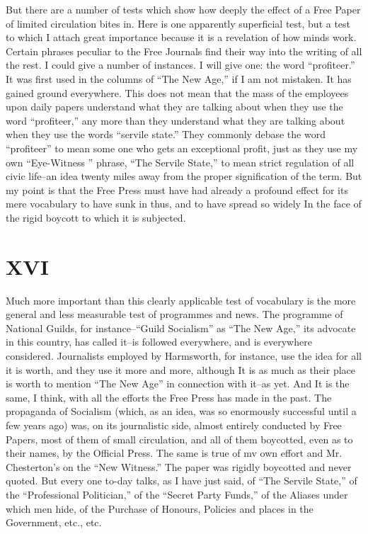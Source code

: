 \documentclass{book}
\begin{document}
But there are a number of tests which show how deeply the effect of a Free Paper of limited circulation bites in. Here is one apparently superficial test, but a test to which I attach great importance because it is a revelation of how minds work. Certain phrases peculiar to the Free Journals find their way into the writing of all the rest. I could give a number of instances. I will give one: the word “profiteer.” It was first used in the columns of “The New Age,” if I am not mistaken. It has gained ground everywhere. This does not mean that the mass of the employees upon daily papers understand what they are talking about when they use the word “profiteer,” any more than they understand what they are talking about when they use the words “servile state.” They commonly debase the word “profiteer” to mean some one who gets an exceptional profit, just as they use my own “Eye-Witness ” phrase, “The Servile State,” to mean strict regulation of all civic life–an idea twenty miles away from the proper signification of the term. But my point is that the Free Press must have had already a profound effect for its mere vocabulary to have sunk in thus, and to have spread so widely In the face of the rigid boycott to which it is subjected.

\chapter*{XVI}
\label{chapter-17}
Much more important than this clearly applicable test of vocabulary is the more general and less measurable test of programmes and news. The programme of National Guilds, for instance–“Guild Socialism” as “The New Age,” its advocate in this country, has called it–is followed everywhere, and is everywhere considered. Journalists employed by Harmsworth, for instance, use the idea for all it is worth, and they use it more and more, although It is as much as their place is worth to mention “The New Age” in connection with it–as yet. And It is the same, I think, with all the efforts the Free Press has made in the past. The propaganda of Socialism (which, as an idea, was so enormously successful until a few years ago) was, on its journalistic side, almost entirely conducted by Free Papers, most of them of small circulation, and all of them boycotted, even as to their names, by the Official Press. The same is true of mv own effort and Mr. Chesterton’s on the “New Witness.” The paper was rigidly boycotted and never quoted. But every one to-day talks, as I have just said, of “The Servile State,” of the “Professional Politician,” of the “Secret Party Funds,” of the Aliases under which men hide, of the Purchase of Honours, Policies and places in the Government, etc., etc.
\end{document}
